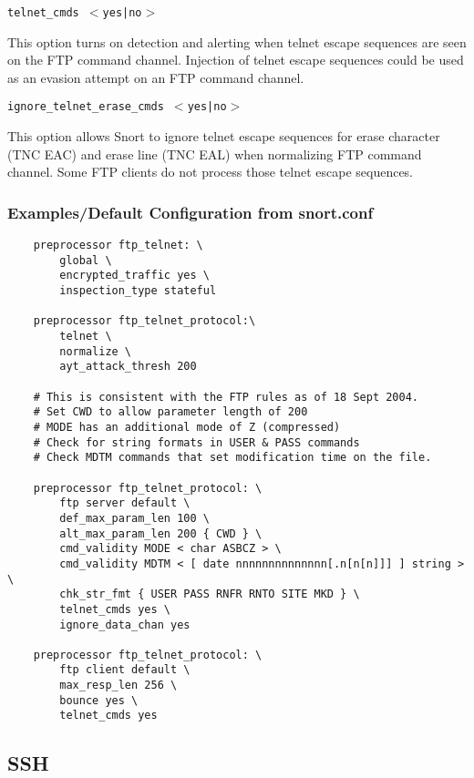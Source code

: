 \documentclass[english]{report}
\newcounter{slistnum}
\newenvironment{slist}
{ \begin{list}{ {\bf \arabic{slistnum}.} }{\usecounter{slistnum} } }
{ \end{list} }
\begin{document}
\begin{slist}
\begin{itemize}
\end{itemize}

\item \texttt{telnet\_cmds $<$yes|no$>$}

This option turns on detection and alerting when telnet escape sequences are
seen on the FTP command channel.  Injection of telnet escape sequences could be
used as an evasion attempt on an FTP command channel.

\item \texttt{ignore\_telnet\_erase\_cmds $<$yes|no$>$}

This option allows Snort to ignore telnet escape sequences for erase character
(TNC EAC) and erase line (TNC EAL) when normalizing FTP command channel.  Some FTP
clients do not process those telnet escape sequences.

\end{slist}

\subsubsection{Examples/Default Configuration from snort.conf}
\begin{verbatim}
    preprocessor ftp_telnet: \
        global \
        encrypted_traffic yes \
        inspection_type stateful

    preprocessor ftp_telnet_protocol:\
        telnet \
        normalize \
        ayt_attack_thresh 200

    # This is consistent with the FTP rules as of 18 Sept 2004.
    # Set CWD to allow parameter length of 200
    # MODE has an additional mode of Z (compressed)
    # Check for string formats in USER & PASS commands
    # Check MDTM commands that set modification time on the file.

    preprocessor ftp_telnet_protocol: \
        ftp server default \
        def_max_param_len 100 \
        alt_max_param_len 200 { CWD } \
        cmd_validity MODE < char ASBCZ > \
        cmd_validity MDTM < [ date nnnnnnnnnnnnnn[.n[n[n]]] ] string > \
        chk_str_fmt { USER PASS RNFR RNTO SITE MKD } \
        telnet_cmds yes \
        ignore_data_chan yes

    preprocessor ftp_telnet_protocol: \
        ftp client default \
        max_resp_len 256 \
        bounce yes \
        telnet_cmds yes
\end{verbatim}

\subsection{SSH}
\label{sub:ssh}
\end{document}
